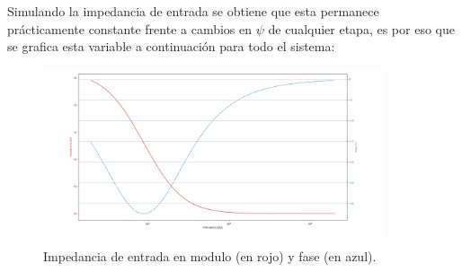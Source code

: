 Simulando la impedancia de entrada se obtiene que esta permanece prácticamente constante frente a cambios en $\psi$ de cualquier etapa, es por eso que se grafica esta variable a continuación para todo el sistema:

\begin{figure}[H]
\centering
	\includegraphics[width=0.9\textwidth]{Imagenes/Zin.png}
	\caption{Impedancia de entrada en modulo (en rojo) y fase (en azul).}
	\label{fig:zin}
\end{figure}

